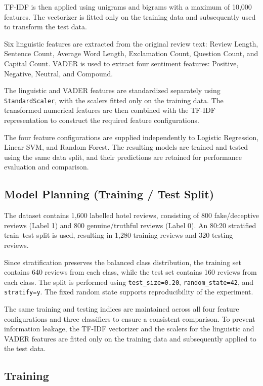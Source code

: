 \documentclass[12pt,a4paper]{report}
\begin{document}
TF-IDF is then applied using unigrams and bigrams with a maximum of
10,000 features. The vectorizer is fitted only on the training data
and subsequently used to transform the test data.

Six linguistic features are extracted from the original review text:
Review Length, Sentence Count, Average Word Length, Exclamation Count,
Question Count, and Capital Count. VADER is used to extract four
sentiment features: Positive, Negative, Neutral, and Compound.

The linguistic and VADER features are standardized separately using
\texttt{StandardScaler}, with the scalers fitted only on the training
data. The transformed numerical features are then combined with the
TF-IDF representation to construct the required feature
configurations.

The four feature configurations are supplied independently to
Logistic Regression, Linear SVM, and Random Forest. The resulting
models are trained and tested using the same data split, and their
predictions are retained for performance evaluation and comparison.

\subsection{Model Planning (Training / Test Split)}

The dataset contains 1,600 labelled hotel reviews, consisting of 800
fake/deceptive reviews (Label 1) and 800 genuine/truthful reviews
(Label 0). An 80:20 stratified train--test split is used, resulting in
1,280 training reviews and 320 testing reviews.

Since stratification preserves the balanced class distribution, the
training set contains 640 reviews from each class, while the test set
contains 160 reviews from each class. The split is performed using
\texttt{test\_size=0.20}, \texttt{random\_state=42}, and
\texttt{stratify=y}. The fixed random state supports reproducibility
of the experiment.

The same training and testing indices are maintained across all four
feature configurations and three classifiers to ensure a consistent
comparison. To prevent information leakage, the TF-IDF vectorizer and
the scalers for the linguistic and VADER features are fitted only on
the training data and subsequently applied to the test data.

\subsection{Training}
\end{document}
